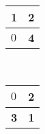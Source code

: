 \documentclass[11pt, a4paper, twoside]{article}
\begin{document}
\begin{minipage}{0.5\textwidth}
	\centering
	\begin{tabular}{ | l | l |}
		\hline 
		\textbf{1}  & \textbf{2} \\ 
		\hline 
		$0$  & \textbf{4} \\ 
		\hline
	\end{tabular}  \\
\end{minipage}
\begin{minipage}{0.5\textwidth}
	\begin{tabular}{ | l | l |}
		\hline 
		$0$     & \textbf{2} \\ 
		\hline 
		\textbf{3}  & \textbf{1} \\ 
		\hline
	\end{tabular} \\
\end{minipage}  \\
\end{document}
